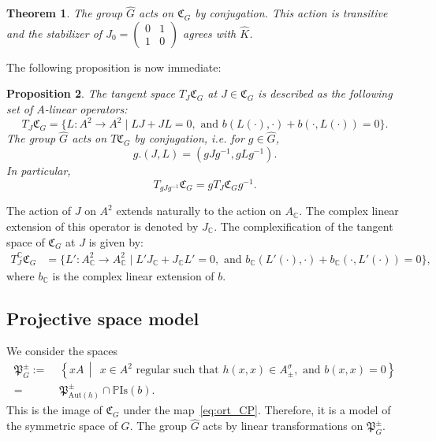 \documentclass[oneside,11pt]{amsart}
\newtheorem{thm}{Theorem}[section]
\newtheorem{prop}[thm]{Proposition}
\theoremstyle{definition}
\theoremstyle{remark}
\newcommand{\midwd}{\,\middle\vert\,}
\numberwithin{thm}{section}
\numberwithin{equation}{section}
\begin{document}
\begin{thm}\label{thm:involaopermodel_OC}
    The group $\hat G$ acts on $\mathfrak{C}_G$ by conjugation. This action is transitive and the stabilizer of $J_0=\begin{pmatrix}
        0 & 1 \\
        1 & 0
    \end{pmatrix}$
    agrees with $\hat K$.
\end{thm}

The following proposition is now immediate:

\begin{prop}\label{prop:tangent_sio_OC}
    The tangent space $T_J\mathfrak{C}_G$ at $J\in \mathfrak{C}_G$ is described as the following set of $A$-linear operators:
    $$T_J\mathfrak{C}_G=\{L\colon A^2\to A^2\mid LJ+JL=0,\text{ and } b(L(\cdot),\cdot)+b(\cdot,L(\cdot))=0\}.$$
    The group $\hat G$ acts on $T\mathfrak{C}_G$ by conjugation, i.e. for $g\in \hat G$,  
    $$
    g.(J,L)=(gJg^{-1},gLg^{-1}).
    $$ 
    In particular, 
    $$
    T_{gJg^{-1}}\mathfrak{C}_G = gT_J\mathfrak{C}_Gg^{-1}.
    $$
\end{prop}

The action of $J$ on $A^2$ extends naturally to the action on $A_\mathbb{C}$. The complex linear extension of this operator is denoted by $J_{\mathbb C}$. The complexification of the tangent space of $\mathfrak C_G$ at $J$ is given by:
\begin{align*}
    T_J^\mathbb C\mathfrak{C}_G & =\{L'\colon A_\mathbb{C}^2\to A_\mathbb{C}^2\mid L'J_\mathbb C+J_\mathbb CL'=0,\text{ and } b_\mathbb C(L'(\cdot),\cdot)+b_\mathbb C(\cdot,L'(\cdot))=0\},
\end{align*}
where $b_\mathbb C$ is the complex linear extension of $b$.

\subsection{Projective space model}\label{sec:projective_OC}

We consider the spaces
\begin{align*}
    \mathfrak{P}_G^\pm:=&\;\left\{xA\midwd\; x\in A^{2}\text{ regular such that }h(x,x)\in A^{\sigma}_{\pm},\text{ and }b(x,x)=0 \right\}\\
    =&\;\mathfrak{P}_{\mathrm{Aut}(h)}^\pm\cap\mathbb P\mathrm{Is}(b).
\end{align*}
This is the image of $\mathfrak{C}_{G}$ under the map~\eqref{eq:ort_CP}. Therefore, it is a model of the symmetric space of $G$. The group $\hat G$ acts by linear transformations on $\mathfrak{P}_{G}^\pm$.
\end{document}
